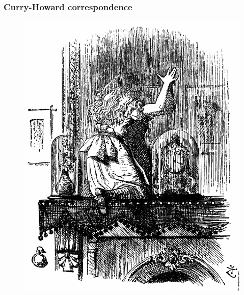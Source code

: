 \documentclass[
xcolor={usenames,dvipsnames,svgnames},
]{beamer}
\begin{document}
  \begin{frame}
    \frametitle{Curry-Howard correspondence}
    \begin{figure}
      \begin{minipage}{.5\textwidth}
        \includegraphics[width=\textwidth]{graphics/011-Into-the-looking-glass-q45-1764x2202.jpg}
      \end{minipage}%
      \begin{minipage}{.5\textwidth}

\end{minipage}
\end{figure}
\end{frame}
\end{document}
